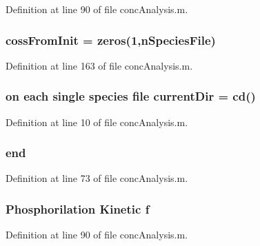 Definition at line 90 of file conc\-Analysis.\-m.

\hypertarget{a00019_a547b10724f74451f717078739944cc74}{
\subsubsection[{coss\-From\-Init}]{\setlength{\rightskip}{0pt plus 5cm}coss\-From\-Init = zeros(1,n\-Species\-File)}}\label{a00019_a547b10724f74451f717078739944cc74}


Definition at line 163 of file conc\-Analysis.\-m.

\hypertarget{a00019_afb60cd67e28ca8c9fa44e4f5452589b9}{
\subsubsection[{current\-Dir}]{\setlength{\rightskip}{0pt plus 5cm}on each single {\bf species} {\bf file} current\-Dir = {\bf cd}()}}\label{a00019_afb60cd67e28ca8c9fa44e4f5452589b9}


Definition at line 10 of file conc\-Analysis.\-m.

\hypertarget{a00019_afb358f48b1646c750fb9da6c6585be2b}{
\subsubsection[{end}]{\setlength{\rightskip}{0pt plus 5cm}end}}\label{a00019_afb358f48b1646c750fb9da6c6585be2b}


Definition at line 73 of file conc\-Analysis.\-m.

\hypertarget{a00019_a9c5a71c46b1abb8b7df5ebeac6c81535}{
\subsubsection[{f}]{\setlength{\rightskip}{0pt plus 5cm}Phosphorilation Kinetic f}}\label{a00019_a9c5a71c46b1abb8b7df5ebeac6c81535}


Definition at line 90 of file conc\-Analysis.\-m.


